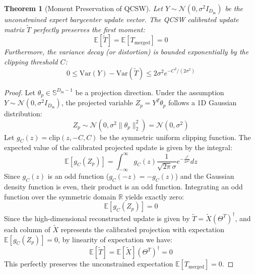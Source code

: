 \documentclass{article}
\theoremstyle{plain}
\newtheorem{theorem}{Theorem}[section]
\theoremstyle{definition}
\theoremstyle{remark}
\begin{document}
\begin{theorem}[Moment Preservation of QCSW]
\label{thm:moment}
Let $Y \sim \mathcal{N}(0, \sigma^2 I_{D_{\text{in}}})$ be the unconstrained expert barycenter update vector. The QCSW calibrated update matrix $\tilde{T}$ perfectly preserves the first moment:
\begin{equation}
\mathbb{E}[\tilde{T}] = \mathbb{E}[T_{\text{merged}}] = 0
\end{equation}
Furthermore, the variance decay (or distortion) is bounded exponentially by the clipping threshold $C$:
\begin{equation}
0 \le \text{Var}(Y) - \text{Var}(\tilde{T}) \le 2\sigma^2 e^{-C^2 / (2\sigma^2)}
\end{equation}
\end{theorem}

\begin{proof}
Let $\theta_p \in \mathbb{S}^{D_{\text{in}}-1}$ be a projection direction. Under the assumption $Y \sim \mathcal{N}(0, \sigma^2 I_{D_{\text{in}}})$, the projected variable $Z_p = Y^T \theta_p$ follows a 1D Gaussian distribution:
\begin{equation}
Z_p \sim \mathcal{N}(0, \sigma^2 \|\theta_p\|_2^2) = \mathcal{N}(0, \sigma^2)
\end{equation}
Let $g_C(z) = \text{clip}(z, -C, C)$ be the symmetric uniform clipping function. The expected value of the calibrated projected update is given by the integral:
\begin{equation}
\mathbb{E}[g_C(Z_p)] = \int_{-\infty}^{\infty} g_C(z) \frac{1}{\sqrt{2\pi}\sigma} e^{-\frac{z^2}{2\sigma^2}} dz
\end{equation}
Since $g_C(z)$ is an odd function ($g_C(-z) = -g_C(z)$) and the Gaussian density function is even, their product is an odd function. Integrating an odd function over the symmetric domain $\mathbb{R}$ yields exactly zero:
\begin{equation}
\mathbb{E}[g_C(Z_p)] = 0
\end{equation}
Since the high-dimensional reconstructed update is given by $\tilde{T} = \tilde{X} (\Theta^T)^\dagger$, and each column of $\tilde{X}$ represents the calibrated projection with expectation $\mathbb{E}[g_C(Z_p)] = 0$, by linearity of expectation we have:
\begin{equation}
\mathbb{E}[\tilde{T}] = \mathbb{E}[\tilde{X}] (\Theta^T)^\dagger = 0
\end{equation}
This perfectly preserves the unconstrained expectation $\mathbb{E}[T_{\text{merged}}] = 0$.


\end{proof}
\end{document}
